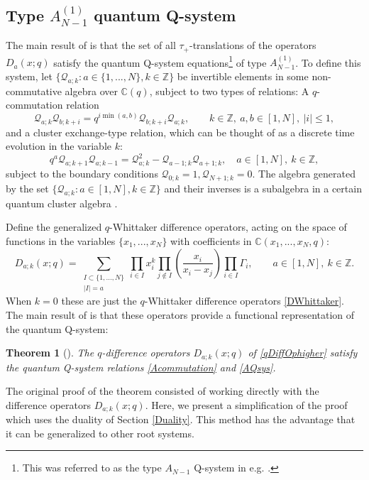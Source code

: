 \documentclass[12pt]{amsart}
\newtheorem{thm}{Theorem}[section]
\newcommand{\C}{{\mathbb C}}
\newcommand{\Z}{{\mathbb Z}}
\newcommand{\Q}{{\mathcal Q}}
\numberwithin{equation}{section}
\begin{document}
%
%
%
%
%
%
%
%
%
%
%
%
%
%
%
%
%
%
%
%
%
%








\subsection{Type $A^{(1)}_{N-1}$ quantum Q-system}\label{sec:24} 
The main result of \cite{DFK15} is that the set of all $\tau_+$-translations of the operators $D_a(x;q)$ satisfy the quantum Q-system equations\footnote{This was referred to as the type $A_{N-1}$ Q-system in e.g. \cite{DFK15}.} of type $A^{(1)}_{N-1}$. To define this system, let $\{ \Q_{a;k}: a\in\{1,...,N\},k\in\Z\}$ be invertible elements in some non-commutative algebra over $\C(q)$, subject to two types of relations: A $q$-commutation relation
\begin{equation}\label{Acommutation}
\Q_{a;k}\Q_{b;k+i} = q^{i\min(a,b)} \Q_{b;k+i}\Q_{a;k}, \qquad k\in\Z,\ a,b\in[1,N],\ |i|\leq 1,
\end{equation}
and a cluster exchange-type relation, which can be thought of as  a discrete time evolution in the  variable $k$:
\begin{equation}\label{AQsys}
q^a \Q_{a;k+1}\Q_{a;k-1}=\Q_{a;k}^2-\Q_{a-1;k}\Q_{a+1;k},\quad a\in[1,N],\ k\in\Z,
\end{equation}
subject to the boundary conditions $\Q_{0;k}=1, \Q_{N+1;k}=0$. The algebra generated by the set $\{\Q_{a;k}: a\in[1,N], k\in\Z\}$ and their inverses is a subalgebra in a certain quantum cluster algebra \cite{DFKnoncom}.

Define the generalized $q$-Whittaker difference operators, acting on the space of functions in the variables $\{x_1,...,x_N\}$ with coefficients in $\C(x_1,...,x_N,q)$:
\begin{equation}\label{qDiffOphigher}
D_{a;k}(x;q) = \sum_{\substack{ I\subset\{1,...,N\}\\ |I|=a}} \prod_{i\in I} x_i^k
 \prod_{j\notin I}\left(
\frac{x_i}{x_i-x_j} \right)\prod_{i\in I} \Gamma_i, \qquad a\in[1,N],\ k\in\Z.
\end{equation}
When $k=0$ these are just the $q$-Whittaker difference operators \eqref{DWhittaker}.
The main result of \cite{DFK15} is that these operators provide a functional representation of the quantum Q-system:
\begin{thm}[\cite{DFK15}] \label{Atheorem} The $q$-difference operators $D_{a;k}(x;q)$ of \eqref{qDiffOphigher} satisfy the quantum Q-system relations \eqref{Acommutation} and \eqref{AQsys}.
\end{thm}
The original proof of the theorem consisted of working directly with the difference operators $D_{a;k}(x;q)$.
Here, we present a simplification of the proof which uses the duality of Section \ref{Duality}. This method has the advantage that it can be generalized to other root systems.
\end{document}
